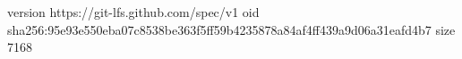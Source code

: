 version https://git-lfs.github.com/spec/v1
oid sha256:95e93e550eba07c8538be363f5ff59b4235878a84af4ff439a9d06a31eafd4b7
size 7168
